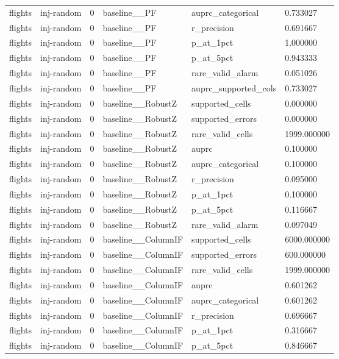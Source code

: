 \begin{tabular}{llllll}
flights & inj-random & 0 & baseline\_\_PF & auprc\_categorical & 0.733027 \\
flights & inj-random & 0 & baseline\_\_PF & r\_precision & 0.691667 \\
flights & inj-random & 0 & baseline\_\_PF & p\_at\_1pct & 1.000000 \\
flights & inj-random & 0 & baseline\_\_PF & p\_at\_5pct & 0.943333 \\
flights & inj-random & 0 & baseline\_\_PF & rare\_valid\_alarm & 0.051026 \\
flights & inj-random & 0 & baseline\_\_PF & auprc\_supported\_cols & 0.733027 \\
flights & inj-random & 0 & baseline\_\_RobustZ & supported\_cells & 0.000000 \\
flights & inj-random & 0 & baseline\_\_RobustZ & supported\_errors & 0.000000 \\
flights & inj-random & 0 & baseline\_\_RobustZ & rare\_valid\_cells & 1999.000000 \\
flights & inj-random & 0 & baseline\_\_RobustZ & auprc & 0.100000 \\
flights & inj-random & 0 & baseline\_\_RobustZ & auprc\_categorical & 0.100000 \\
flights & inj-random & 0 & baseline\_\_RobustZ & r\_precision & 0.095000 \\
flights & inj-random & 0 & baseline\_\_RobustZ & p\_at\_1pct & 0.100000 \\
flights & inj-random & 0 & baseline\_\_RobustZ & p\_at\_5pct & 0.116667 \\
flights & inj-random & 0 & baseline\_\_RobustZ & rare\_valid\_alarm & 0.097049 \\
flights & inj-random & 0 & baseline\_\_ColumnIF & supported\_cells & 6000.000000 \\
flights & inj-random & 0 & baseline\_\_ColumnIF & supported\_errors & 600.000000 \\
flights & inj-random & 0 & baseline\_\_ColumnIF & rare\_valid\_cells & 1999.000000 \\
flights & inj-random & 0 & baseline\_\_ColumnIF & auprc & 0.601262 \\
flights & inj-random & 0 & baseline\_\_ColumnIF & auprc\_categorical & 0.601262 \\
flights & inj-random & 0 & baseline\_\_ColumnIF & r\_precision & 0.696667 \\
flights & inj-random & 0 & baseline\_\_ColumnIF & p\_at\_1pct & 0.316667 \\
flights & inj-random & 0 & baseline\_\_ColumnIF & p\_at\_5pct & 0.846667 \\

\end{tabular}
